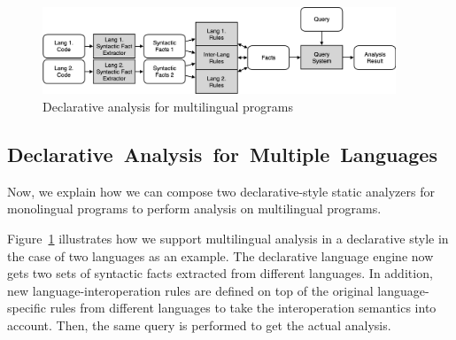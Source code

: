 \begin{figure}[t]
  \centering
  \vspace{2mm}
  \includegraphics[width=0.94\textwidth]{img/ov2.png}
  \caption{Declarative analysis for multilingual programs}
  \label{fig:ov2}
\end{figure}

\subsection{\mbox{Declarative Analysis for Multiple Languages}}
Now, we explain how we can compose two declarative-style static analyzers
for monolingual programs to perform analysis on multilingual programs.

Figure~\ref{fig:ov2} illustrates how we support multilingual
analysis in a declarative style in the case of two languages as an
example. The declarative language engine now gets two sets of
syntactic facts extracted from different languages. In addition,
new language-interoperation rules are defined on top of the original
language-specific rules from different languages to take the
interoperation semantics into account. Then, the same query is performed
to get the actual analysis.

